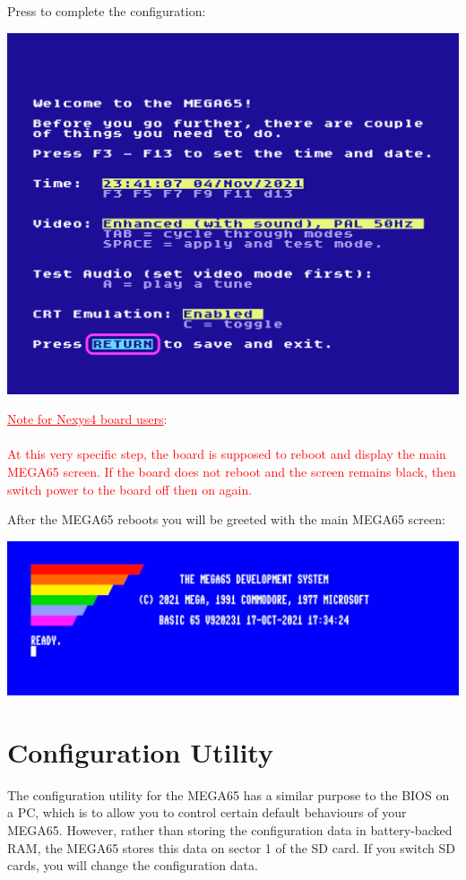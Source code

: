 Press  to complete the configuration:

\begin{center}
  \includegraphics[trim= 6mm 6mm 6mm 6mm,clip,width=0.7\linewidth]{images/img011_final_boot_05.png}
\end{center}

\ifdefined\printmanual
\else
\textcolor{red}{\underline{Note for Nexys4 board users}: \\
\\
  At this very specific step, the board is supposed to reboot and display the main MEGA65 screen. If the board does not reboot and the screen remains black, then switch power to the board off then on again.}
\fi

After the MEGA65 reboots you will be greeted with the main MEGA65 screen:

\begin{center}
  \includegraphics[trim=0 2cm 0 0,clip,width=0.7\linewidth]{images/img011_final_boot_06.png}
\end{center}

\section{Configuration Utility}
\label{sec:configuration-utility}

The configuration utility for the MEGA65 has a similar purpose to the BIOS on a PC, which is to allow you to control certain default behaviours of your MEGA65. However, rather than storing the configuration data in
battery-backed RAM, the MEGA65 stores this data on sector 1 of the SD card. If you switch SD cards, you will change the configuration data.

